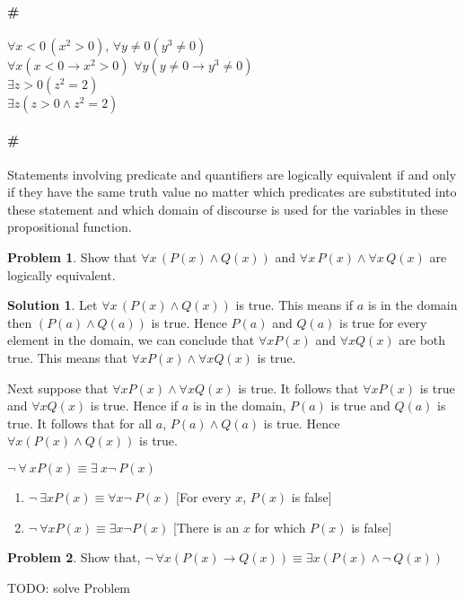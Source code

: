 \documentclass[12pt,oneside,a4paper]{book}
\theoremstyle{remark}
\theoremstyle{definition}
\newtheorem{prob}{Problem}[section]
\newtheorem*{soln}{Solution}
\newcommand{\px}{P(x)}
\begin{document}
\paragraph{\#}\(\forall x<0\,(x^2>0)\), \(\forall y\neq 0(y^3\neq 0)\)\\
\(\forall x (x<0 \rightarrow x^2>0)\) \(\forall y (y\neq 0\rightarrow y^3\neq0)\)\\
\(\exists z>0(z^2=2)\)\\\(\exists z (z>0\wedge z^2=2)\)
\paragraph{\#} Statements involving predicate and quantifiers are logically equivalent if and only if they have the same truth value no matter which predicates are substituted into these statement and which domain of discourse is used for the variables in these propositional function.
\begin{prob}
    Show that \(\forall x\,(P(x)\wedge Q(x))\) and \(\forall x\,P(x)\wedge \forall x\,Q(x)\) are logically equivalent.
\end{prob}
\begin{soln}
    Let \(\forall x\,(P(x)\wedge Q(x))\) is true. This means if $ a $ is in the domain then \((P(a)\wedge Q(a))\) is true. Hence \(P(a)\) and \(Q(a)\) is true for every element in the domain, we can conclude that \(\forall xP(x)\) and \(\forall xQ(x)\) are both true. This means that \(\forall xP(x)\wedge\forall x Q(x)\) is true.

    Next suppose that \(\forall xP(x)\wedge\forall x Q(x)\) is true. It follows that \(\forall xP(x)\) is true and \(\forall xQ(x)\) is true.
    Hence if $ a $ is in the domain, \(P(a)\) is true and \(Q(a)\) is true. It follows that for all $ a $, \(P(a)\wedge  Q(a)\) is true. Hence \(\forall x(P(x)\wedge Q(x))\) is true.
\end{soln}
\(\neg\ \forall\ xP(x)\equiv\exists\ x\neg\ P(x)\)
\begin{enumerate}
    \item \( \neg\ \exists x \px \equiv \forall x \neg\ \px\) [For every $ x $, $ \px $ is false]
    \item \(\neg\ \forall x\px \equiv\exists x\neg\px\) [There is an $ x $ for which $ \px $ is false]
\end{enumerate}
\begin{prob}
    Show that, \(\neg\ \forall x(\px\to Q(x))\equiv\exists x(\px\wedge\neg\ Q(x))\)
\end{prob}
TODO: solve Problem
\end{document}
